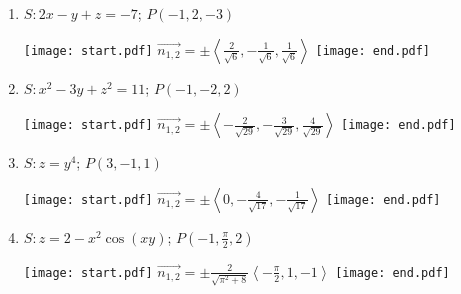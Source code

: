 \documentclass[12pt]{article}
\begin{document}
\begin{enumerate}

\item $S: 2x-y+z=-7$; $P(-1,2,-3)$

\texttt{[image: start.pdf]}
{{$\overrightarrow{n_{1,2}}=\pm \left\langle \frac{2}{\sqrt{6}},-\frac{1}{\sqrt{6}},\frac{1}{\sqrt{6}} \right\rangle$}}
\texttt{[image: end.pdf]}


\item $S: x^2-3y+z^2=11$; $P(-1,-2,2)$

\texttt{[image: start.pdf]}
{{$\overrightarrow{n_{1,2}}=\pm \left\langle -\frac{2}{\sqrt{29}},-\frac{3}{\sqrt{29}},\frac{4}{\sqrt{29}} \right\rangle$}}
\texttt{[image: end.pdf]}


\item $S: z=y^4$; $P(3,-1,1)$

\texttt{[image: start.pdf]}
{{$\overrightarrow{n_{1,2}}=\pm \left\langle 0,-\frac{4}{\sqrt{17}},-\frac{1}{\sqrt{17}} \right\rangle$}}
\texttt{[image: end.pdf]}


\item $S: z=2-x^2\cos{(xy)}$; $P\left(-1,\frac{\pi}{2},2\right)$

\texttt{[image: start.pdf]}
{{$\overrightarrow{n_{1,2}}=\pm \frac{2}{\sqrt{\pi^2+8}}\left\langle -\frac{\pi}{2},1,-1 \right\rangle$}}
\texttt{[image: end.pdf]}


\end{enumerate}

\end{document}
